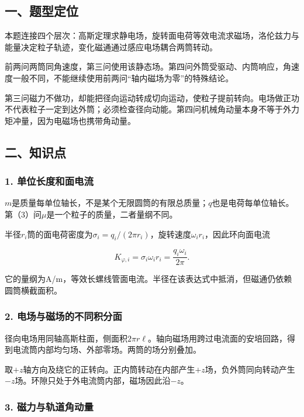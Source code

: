 \documentclass[12pt,a4paper,fontset=fandol]{ctexart}
\begin{document}
\subsection{一、题型定位}\label{ux4e00ux9898ux578bux5b9aux4f4d-5}

本题连接四个层次：高斯定理求静电场，旋转面电荷等效电流求磁场，洛伦兹力与能量决定粒子轨迹，变化磁通通过感应电场耦合两筒转动。

前两问两筒同角速度，第三问使用该静态场。第四问外筒受驱动、内筒响应，角速度一般不同，不能继续使用前两问``轴内磁场为零''的特殊结论。

第三问磁力不做功，却能把径向运动转成切向运动，使粒子提前转向。电场做正功不代表粒子一定到达外筒；必须检查径向动能。第四问机械角动量本身不等于外力矩冲量，因为电磁场也携带角动量。

\subsection{二、知识点}\label{ux4e8cux77e5ux8bc6ux70b9-5}

\subsubsection{1.
单位长度和面电流}\label{ux5355ux4f4dux957fux5ea6ux548cux9762ux7535ux6d41}

\(m\)是质量每单位轴长，不是某个无限圆筒的有限总质量；\(q\)也是电荷每单位轴长。第（3）问\(\mu\)是一个粒子的质量，二者量纲不同。

半径\(r_i\)筒的面电荷密度为\(\sigma_i=q_i/(2\pi r_i)\)，旋转速度\(\omega_i r_i\)，因此环向面电流

\[
K_{\varphi,i}=\sigma_i\omega_i r_i
=\frac{q_i\omega_i}{2\pi}.
\]

它的量纲为A/m，等效长螺线管面电流。半径在该表达式中抵消，但磁通仍依赖圆筒横截面积。

\subsubsection{2.
电场与磁场的不同积分面}\label{ux7535ux573aux4e0eux78c1ux573aux7684ux4e0dux540cux79efux5206ux9762}

径向电场用同轴高斯柱面，侧面积\(2\pi r\ell\)。轴向磁场用跨过电流面的安培回路，得到电流筒内部均匀场、外部零场。两筒的场分别叠加。

取\(+z\)轴方向及绕它的正转向。正内筒转动在内部产生\(+z\)场，负外筒同向转动产生\(-z\)场。环隙只处于外电流筒内部，磁场因此沿\(-z\)。

\subsubsection{3.
磁力与轨道角动量}\label{ux78c1ux529bux4e0eux8f68ux9053ux89d2ux52a8ux91cf}
\end{document}
